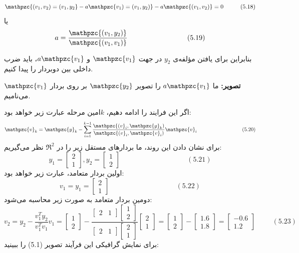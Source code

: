 \documentclass[a4paper,12pt]{report}
\begin{document}
	 $$
	 \mathpzc{(v_1,v_2)=(v_1,y_2}-a\mathpzc{v_1)=(v_1,y_2)}-a\mathpzc{(v_1,v_2)}=0 \hspace{1cm} (5.18)
	 $$
	 یا
	 $$
	 a=\frac{\mathpzc{(v_1,y_2)}}{\mathpzc{(v_1,v_1)}} \hspace{3cm} (5.19)
	 $$
	 
	 بنابراین برای یافتن مؤلفه‌ی $ y_2 $ در جهت $ \mathpzc{v_1} $ و $ a\mathpzc{v_1} $، باید ضرب داخلی بین دوبردار را پیدا کنیم.
	 
	 \textbf{تصویر:}
	 ما $ a\mathpzc{v_1} $ را تصویر $ \mathpzc{y_2} $ بر روی بردار $ \mathpzc{v_1} $ می‌نامیم.
	 
	 اگر این فرایند را ادامه دهیم، $ k $امین مرحله عبارت زیر خواهد بود:
	 $$
	 \mathpzc{v}_k=\mathpzc{y}_k-\sum_{i=1}^{k-1}\frac{\mathpzc{(v}_i,\mathpzc{y}_k)}{\mathpzc{(v}_i,\mathpzc{v}_i)}\mathpzc{v}_i \hspace{3cm} (5.20)
	 $$
	 برای نشان دادن این روند، ما بردارهای مستقل زیر را در $ \Re^2 $ نظر می‌گیریم:
	 $$
	 y_1=
	 \begin{bmatrix}
	 	2 \\ 1
	 \end{bmatrix}
 	, y_2=
 	\begin{bmatrix}
 		1 \\ 2
 	\end{bmatrix}
 	\hspace{4cm} (5.21)
	 $$
	 اولین بردار متعامد، عبارت زیر خواهد بود:
	 $$
	 v_1=y_1=
	 \begin{bmatrix}
	 	2 \\ 1
	 \end{bmatrix}
 	\hspace{4cm} (5.22)
	 $$
	 دومین بردار متعامد به صورت زیر محاسبه می‌شود:
	 $$
	 v_2=y_2-\frac{v_1^Ty_2}{v_1^Tv_1}v_1=
	 \begin{bmatrix}
	 	1 \\ 2
	 \end{bmatrix}-
 	\frac{
 		\begin{bmatrix}
 			2 & 1
	 	\end{bmatrix}
	 	\begin{bmatrix}
	 		1 \\ 2
	 	\end{bmatrix}
 	}{
 		\begin{bmatrix}
 			2 & 1
 		\end{bmatrix}
 		\begin{bmatrix}
 			2 \\ 1
 		\end{bmatrix}
 	}
 	\begin{bmatrix}
 		2 \\ 1
 	\end{bmatrix}
	 =
 	\begin{bmatrix}
 		1 \\ 2
 	\end{bmatrix}
 	-
 	\begin{bmatrix}
 		1.6 \\ 1.8
 	\end{bmatrix}
 	=
 	\begin{bmatrix}
 		-0.6 \\ 1.2
 	\end{bmatrix}
 	\hspace{1cm} (5.23)
	 $$
	برای نمایش گرافیکی این فرآیند تصویر (5.1) را ببینید:
	
\end{document}
